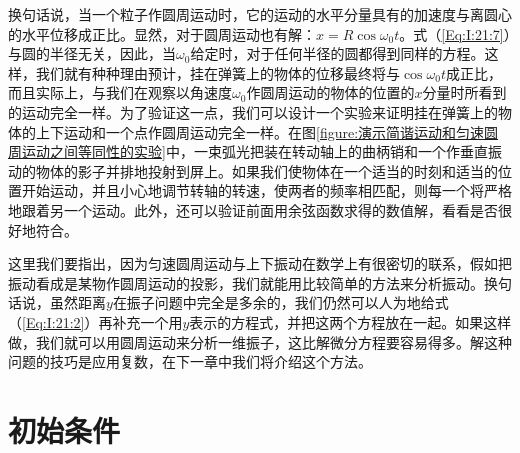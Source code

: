 换句话说，当一个粒子作圆周运动时，它的运动的水平分量具有的加速度与离圆心的水平位移成正比。显然，对于圆周运动也有解：$x=R\cos\omega_0t$。式（\ref{Eq:I:21:7}）与圆的半径无关，因此，当$\omega_0$给定时，对于任何半径的圆都得到同样的方程。这样，我们就有种种理由预计，挂在弹簧上的物体的位移最终将与$\cos\omega_0t$成正比，而且实际上，与我们在观察以角速度$\omega_0$作圆周运动的物体的位置的$x$分量时所看到的运动完全一样。为了验证这一点，我们可以设计一个实验来证明挂在弹簧上的物体的上下运动和一个点作圆周运动完全一样。在图\ref{figure:演示简谐运动和匀速圆周运动之间等同性的实验}中，一束弧光把装在转动轴上的曲柄销和一个作垂直振动的物体的影子并排地投射到屏上。如果我们使物体在一个适当的时刻和适当的位置开始运动，并且小心地调节转轴的转速，使两者的频率相匹配，则每一个将严格地跟着另一个运动。此外，还可以验证前面用余弦函数求得的数值解，看看是否很好地符合。

这里我们要指出，因为匀速圆周运动与上下振动在数学上有很密切的联系，假如把振动看成是某物作圆周运动的投影，我们就能用比较简单的方法来分析振动。换句话说，虽然距离$y$在振子问题中完全是多余的，我们仍然可以人为地给式（\ref{Eq:I:21:2}）再补充一个用$y$表示的方程式，并把这两个方程放在一起。如果这样做，我们就可以用圆周运动来分析一维振子，这比解微分方程要容易得多。解这种问题的技巧是应用复数，在下一章中我们将介绍这个方法。

\section{初始条件}

